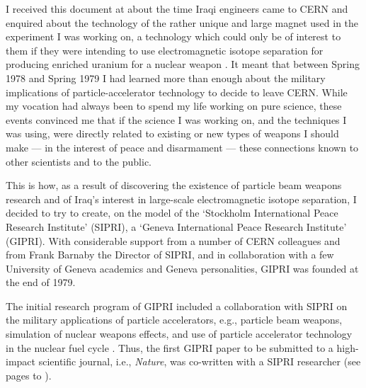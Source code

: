 \documentclass [12pt,a4paper,     ]{report} %
\begin{document}
   I received this document at about the time Iraqi engineers came to CERN and enquired about the technology of the rather unique and large magnet used in the experiment I was working on, a technology which could only be of interest to them if they were intending to use electromagnetic isotope separation for producing enriched uranium for a nuclear weapon \cite{ERKMA2005-}.  It meant that between Spring 1978 and Spring 1979 I had learned more than enough about the military implications of particle-accelerator technology to decide to leave CERN.  While my vocation had always been to spend my life working on pure science, these events convinced me that if the science I was working on, and the techniques I was using, were directly related to existing or new types of weapons I should make --- in the interest of peace and disarmament --- these connections known to other scientists and to the public.

  This is how, as a result of discovering the existence of particle beam weapons research and of Iraq's interest in large-scale electromagnetic isotope separation, I decided to try to create, on the model of the `Stockholm International Peace Research Institute' (SIPRI), a `Geneva International Peace Research Institute' (GIPRI).  With considerable support from a number of CERN colleagues and from Frank Barnaby the Director of SIPRI, and in collaboration with a few University of Geneva academics and Geneva personalities, GIPRI was founded at the end of 1979.


  The initial research program of GIPRI included a collaboration with SIPRI on the military applications of particle accelerators, e.g., particle beam weapons, simulation of nuclear weapons effects, and use of particle accelerator technology in the nuclear fuel cycle \cite{GSPON1983-}.  Thus, the first GIPRI paper to be submitted to a high-impact scientific journal, i.e., \emph{Nature}, was co-written with a SIPRI researcher (see pages \pageref{p-F} to \pageref{p-L}).  
\end{document}
